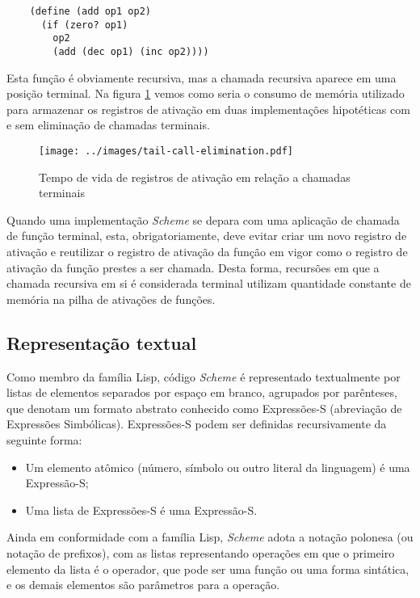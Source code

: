 \begin{lstlisting}
    (define (add op1 op2)
      (if (zero? op1)
        op2
        (add (dec op1) (inc op2))))
\end{lstlisting}

Esta função é obviamente recursiva, mas a chamada recursiva aparece em uma
posição terminal. Na figura \ref{fig:tail-call-elimination} vemos como seria o
consumo de memória utilizado para armazenar os registros de ativação em duas
implementações hipotéticas com e sem eliminação de chamadas terminais.

\begin{figure}[h!]
\centering
\texttt{[image: ../images/tail-call-elimination.pdf]}
\caption{Tempo de vida de registros de ativação em relação a chamadas terminais}
\label{fig:tail-call-elimination}
\end{figure}

Quando uma implementação \textit{Scheme} se depara com uma aplicação de chamada
de função terminal, esta, obrigatoriamente, deve evitar criar um novo registro
de ativação e reutilizar o registro de ativação da função em vigor como o
registro de ativação da função prestes a ser chamada. Desta forma, recursões em
que a chamada recursiva em si é considerada terminal utilizam quantidade
constante de memória na pilha de ativações de funções.

\subsection{Representação textual}

Como membro da família Lisp, código
\textit{Scheme} é representado textualmente por listas de elementos separados
por espaço em branco, agrupados por parênteses, que denotam um formato abstrato
conhecido como Expressões-S (abreviação de Expressões Simbólicas). Expressões-S
podem ser definidas recursivamente da seguinte forma:

\begin{itemize}

\item Um elemento atômico (número, símbolo ou outro literal da linguagem) é uma Expressão-S;

\item Uma lista de Expressões-S é uma Expressão-S.

\end{itemize}

Ainda em conformidade com a família Lisp, \textit{Scheme} adota a notação
polonesa (ou notação de prefixos), com as listas representando operações em que
o primeiro elemento da lista é o operador, que pode ser uma função ou uma forma
sintática, e os demais elementos são parâmetros para a operação.

